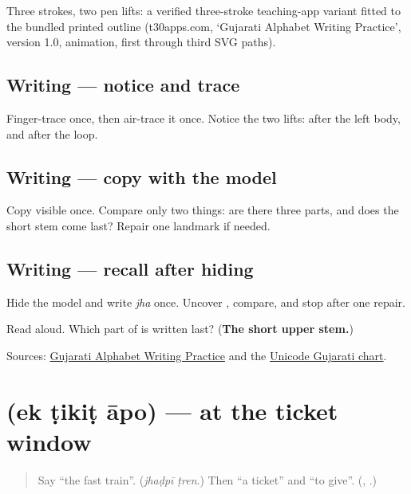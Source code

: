 Three strokes, two pen lifts: a verified three-stroke teaching-app variant fitted to the bundled printed outline (t30apps.com, ‘Gujarati Alphabet Writing Practice’, version 1.0,  animation, first through third SVG paths).

\subsection*{Writing — notice and trace}

Finger-trace \textbf{} once, then air-trace it once. Notice the two lifts: after the left body, and after the loop.

\subsection*{Writing — copy with the model}
Copy visible \textbf{} once. Compare only two things: are there three parts, and does the short stem come last? Repair one landmark if needed.

\subsection*{Writing — recall after hiding}
Hide the model and write \emph{jha} once. Uncover \textbf{}, compare, and stop after one repair.

\begin{tcolorbox}[breakable,colback=teal!4,colframe=teal!35!black,title={Before you move on}]
Read \textbf{  } aloud. Which part of \textbf{} is written last? (\textbf{The short upper stem.})

Sources: \href{https://www.t30apps.com/gujarati-alphabet-writing/}{Gujarati Alphabet Writing Practice} and the \href{https://www.unicode.org/charts/PDF/U0A80.pdf}{Unicode Gujarati chart}.
\end{tcolorbox}
\section[\texorpdfstring{\gu{એક} \gu{ટિકિટ} \gu{આપો} (ek ṭikiṭ āpo)}{એક ટિકિટ આપો (ek ṭikiṭ āpo)}]{   (ek ṭikiṭ āpo) — at the ticket window}

\label{lesson:GU-C280-ek-tikit}



\begin{quote}
Say \textquotedblleft{}the fast train\textquotedblright{}. (\emph{jhaḍpī ṭren}.) Then \textquotedblleft{}a ticket\textquotedblright{} and \textquotedblleft{}to give\textquotedblright{}. (\textbf{}, \textbf{}.)
\end{quote}

